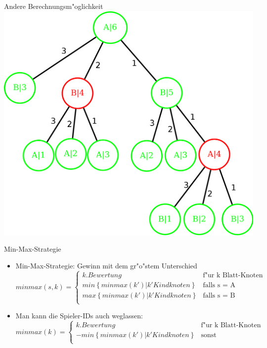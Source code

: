 \documentclass[18pt]{beamer}
\begin{document}
\begin{frame}{Andere Berechnungsm"oglichkeit}
\includegraphics[scale=0.4]{baum8.png}
\end{frame}

\begin{frame}{Min-Max-Strategie}
\begin{itemize}
\item Min-Max-Strategie: Gewinn mit dem gr"o"stem Unterschied
\begin{equation}
   minmax(s,k) =
   \begin{cases}
     k.Bewertung & \text{f"ur k Blatt-Knoten} \\
     min\left\{minmax(k') | k' Kindknoten\right\} & \text{falls s = A} \\
     max\left\{minmax(k') | k' Kindknoten\right\} & \text{falls s = B} \\
   \end{cases}
\end{equation}
\item Man kann die Spieler-IDs auch weglassen:
\begin{equation}
   minmax(k) =
   \begin{cases}
     k.Bewertung & \text{f"ur k Blatt-Knoten} \\
     - min\left\{minmax(k') | k' Kindknoten\right\} & \text{sonst} \\
   \end{cases}
\end{equation}
\end{itemize}
\end{frame}
\end{document}
